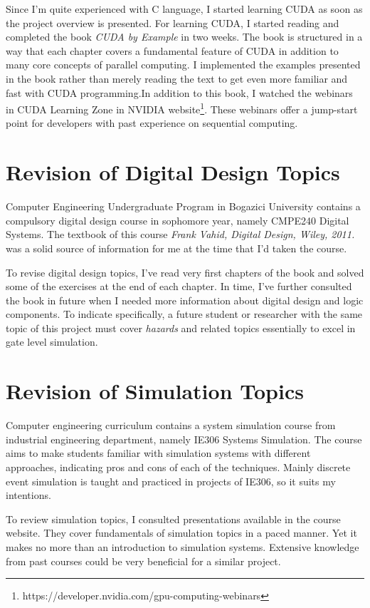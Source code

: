 \documentclass[a4paper,onesided,12pt]{report}
\begin{document}
 Since I'm quite experienced with C language, I started learning CUDA as soon as the project overview is presented. For learning CUDA, I started reading and completed the book \emph{CUDA by Example}\cite{cuda_be} in two weeks. The book is structured in a way that each chapter covers a fundamental feature of CUDA in addition to many core concepts of parallel computing. I implemented the examples presented in the book rather than merely reading the text to get even more familiar and fast with CUDA programming.In addition to this book, I watched the webinars in CUDA Learning Zone in NVIDIA website\footnote{https://developer.nvidia.com/gpu-computing-webinars}. These webinars offer a jump-start point for developers with past experience on sequential computing.
 
 \section{Revision of Digital Design Topics}
 
 Computer Engineering Undergraduate Program in Bogazici University contains a compulsory digital design course in sophomore year, namely CMPE240 Digital Systems. The textbook of this course \emph{Frank Vahid, Digital Design, Wiley, 2011.} was a solid source of information for me at the time that I'd taken the course.
 
 To revise digital design topics, I've read very first chapters of the book and solved some of the exercises at the end of each chapter. In time, I've further consulted the book in future when I needed more information about digital design and logic components. To indicate specifically, a future student or researcher with the same topic of this project must cover \emph{hazards} and related topics essentially to excel in gate level simulation.
 
 \section{Revision of Simulation Topics}
 
 Computer engineering curriculum contains a system simulation course from industrial engineering department, namely IE306 Systems Simulation. The course aims to make students familiar with simulation systems with different approaches, indicating pros and cons of each of the techniques. Mainly discrete event simulation is taught and practiced in projects of IE306, so it suits my intentions.
 
 To review simulation topics, I consulted presentations available in the course website. They cover fundamentals of simulation topics in a paced manner. Yet it makes no more than an introduction to simulation systems. Extensive knowledge from past courses could be very beneficial for a similar project. 
 
\end{document}
